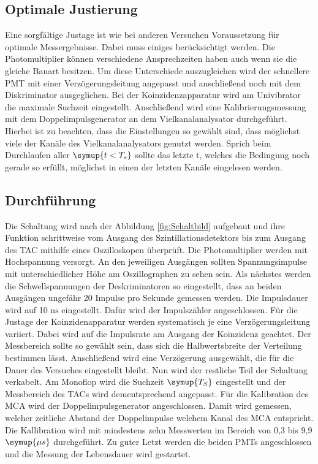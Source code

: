 \subsection{Optimale Justierung}
\label{sec:Justage}
Eine sorgfältige Justage ist wie bei anderen Versuchen Voraussetzung für optimale Messergebnisse. Dabei muss einiges berücksichtigt werden.\newline
\noindent Die Photomultiplier können verschiedene Ansprechzeiten haben auch wenn sie die gleiche Bauart besitzen. Um diese Unterschiede auszugleichen wird der schnellere PMT mit einer Verzögerungsleitung angepasst und anschließend noch mit dem Diskriminator ausgeglichen. \newline
\noindent Bei der Koinzidenzapparatur wird am Univibrator die maximale Suchzeit eingestellt. \newline
\noindent Anschließend wird eine Kalibrierungsmessung mit dem Doppelimpulsgenerator an dem Vielkanalanalysator durchgeführt. Hierbei ist zu beachten, dass die Einstellungen so gewählt sind, dass möglichst viele der Kanäle des Vielkanalanalysators genutzt werden. Sprich beim Durchlaufen aller $\symup{t<T_s}$ sollte das letzte t, welches die Bedingung noch gerade so erfüllt, möglichst in einen der letzten Kanäle eingelesen werden.

\subsection{Durchführung}
\label{Durchführung}
Die Schaltung wird nach der Abbildung \ref{fig:Schaltbild} aufgebaut und ihre Funktion schrittweise vom Ausgang des Szintillationsdetektors bis zum Ausgang des TAC mithilfe eines Oszilloskopen überprüft. \newline
\noindent Die Photomultiplier werden mit Hochspannung versorgt. An den jeweiligen Ausgängen sollten Spannungsimpulse mit unterschiedlicher Höhe am Oszillographen zu sehen sein. Als nächstes werden die Schwellspannungen der Deskriminatoren so eingestellt, dass an beiden Ausgängen ungefähr 20 Impulse pro Sekunde gemessen werden. Die Impulsdauer wird auf 10 $\mathrm{ns}$ eingestellt. Dafür wird der Impulszähler angeschlossen. Für die Justage der Koinzidenapparatur werden systematisch je eine Verzögerungsleitung variiert. Dabei wird auf die Impulsrate am Ausgang der Koinzidenz geachtet. Der Messbereich sollte so gewählt sein, dass sich die Halbwertsbreite der Verteilung bestimmen lässt. Anschließend wird eine Verzögerung ausgewählt, die für die Dauer des Versuches eingestellt bleibt.\newline
\noindent Nun wird der restliche Teil der Schaltung verkabelt. Am Monoflop wird die Suchzeit $\symup{T_S}$ eingestellt und der Messbereich des TACs wird dementsprechend angepasst. Für die Kalibration des MCA wird der Doppelimpulsgenerator angeschlossen. Damit wird gemessen, welcher zeitliche Abstand der Doppelimpulse welchem Kanal des MCA entspricht. Die Kallibration wird mit mindestens zehn Messwerten im Bereich von 0,3 bis 9,9 $\symup{\mu s}$ durchgeführt. 
Zu guter Letzt werden die beiden PMTs angeschlossen und die Messung der Lebensdauer wird gestartet.